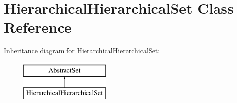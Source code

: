 \hypertarget{classHierarchicalHierarchicalSet}{\section{Hierarchical\-Hierarchical\-Set Class Reference}
\label{classHierarchicalHierarchicalSet}
}
Inheritance diagram for Hierarchical\-Hierarchical\-Set\-:\begin{figure}[H]
\begin{center}
\leavevmode
\includegraphics[height=2.000000cm]{classHierarchicalHierarchicalSet}
\end{center}
\end{figure}
